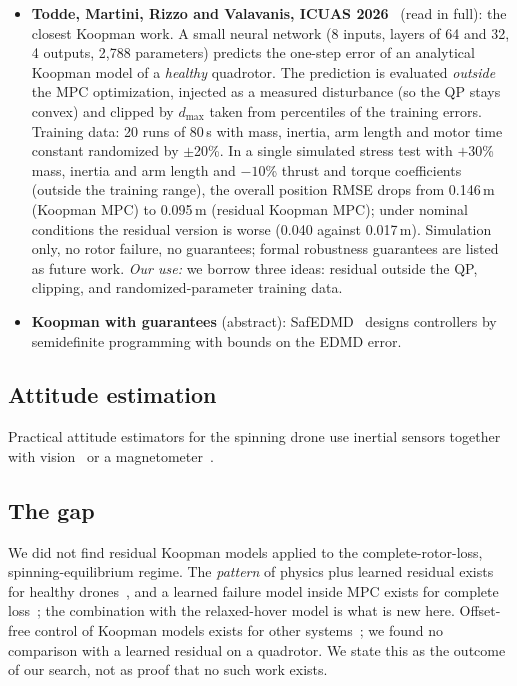 \begin{itemize}
  \item \textbf{Todde, Martini, Rizzo and Valavanis, ICUAS 2026}~\cite{todde2026residual} (read in full): the closest Koopman work. A small neural network (8 inputs, layers of 64 and 32, 4 outputs, 2,788 parameters) predicts the one-step error of an analytical Koopman model of a \emph{healthy} quadrotor. The prediction is evaluated \emph{outside} the MPC optimization, injected as a measured disturbance (so the QP stays convex) and clipped by $d_{\max}$ taken from percentiles of the training errors. Training data: 20 runs of 80\,s with mass, inertia, arm length and motor time constant randomized by $\pm$20\%. In a single simulated stress test with $+30$\% mass, inertia and arm length and $-10$\% thrust and torque coefficients (outside the training range), the overall position RMSE drops from 0.146\,m (Koopman MPC) to 0.095\,m (residual Koopman MPC); under nominal conditions the residual version is worse (0.040 against 0.017\,m). Simulation only, no rotor failure, no guarantees; formal robustness guarantees are listed as future work. \emph{Our use:} we borrow three ideas: residual outside the QP, clipping, and randomized-parameter training data.
  \item \textbf{Koopman with guarantees} (abstract): SafEDMD~\cite{strasser2024safedmd} designs controllers by semidefinite programming with bounds on the EDMD error.
\end{itemize}

\subsection{Attitude estimation}
Practical attitude estimators for the spinning drone use inertial sensors together with vision~\cite{sun2021vision} or a magnetometer~\cite{solanki2022attitude}.

\subsection{The gap}
We did not find residual Koopman models applied to the complete-rotor-loss, spinning-equilibrium regime. The \emph{pattern} of physics plus learned residual exists for healthy drones~\cite{todde2026residual,jin2025dekc}, and a learned failure model inside MPC exists for complete loss~\cite{sun2022ftmpc}; the combination with the relaxed-hover model is what is new here. Offset-free control of Koopman models exists for other systems~\cite{schimperna2025offsetfree}; we found no comparison with a learned residual on a quadrotor. We state this as the outcome of our search, not as proof that no such work exists.
